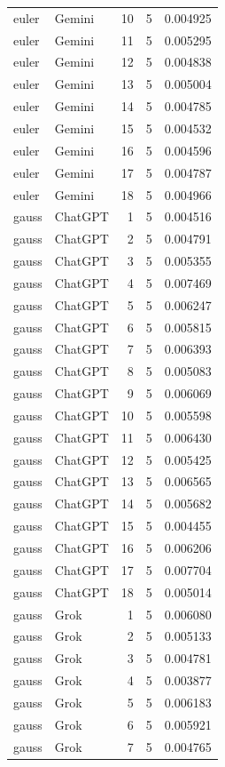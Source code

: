 \begin{longtable}{llrrr}
euler & Gemini & 10 & 5 & 0.004925\\
euler & Gemini & 11 & 5 & 0.005295\\
euler & Gemini & 12 & 5 & 0.004838\\
euler & Gemini & 13 & 5 & 0.005004\\
euler & Gemini & 14 & 5 & 0.004785\\
euler & Gemini & 15 & 5 & 0.004532\\
euler & Gemini & 16 & 5 & 0.004596\\
euler & Gemini & 17 & 5 & 0.004787\\
euler & Gemini & 18 & 5 & 0.004966\\
gauss & ChatGPT & 1 & 5 & 0.004516\\
gauss & ChatGPT & 2 & 5 & 0.004791\\
gauss & ChatGPT & 3 & 5 & 0.005355\\
gauss & ChatGPT & 4 & 5 & 0.007469\\
gauss & ChatGPT & 5 & 5 & 0.006247\\
gauss & ChatGPT & 6 & 5 & 0.005815\\
gauss & ChatGPT & 7 & 5 & 0.006393\\
gauss & ChatGPT & 8 & 5 & 0.005083\\
gauss & ChatGPT & 9 & 5 & 0.006069\\
gauss & ChatGPT & 10 & 5 & 0.005598\\
gauss & ChatGPT & 11 & 5 & 0.006430\\
gauss & ChatGPT & 12 & 5 & 0.005425\\
gauss & ChatGPT & 13 & 5 & 0.006565\\
gauss & ChatGPT & 14 & 5 & 0.005682\\
gauss & ChatGPT & 15 & 5 & 0.004455\\
gauss & ChatGPT & 16 & 5 & 0.006206\\
gauss & ChatGPT & 17 & 5 & 0.007704\\
gauss & ChatGPT & 18 & 5 & 0.005014\\
gauss & Grok & 1 & 5 & 0.006080\\
gauss & Grok & 2 & 5 & 0.005133\\
gauss & Grok & 3 & 5 & 0.004781\\
gauss & Grok & 4 & 5 & 0.003877\\
gauss & Grok & 5 & 5 & 0.006183\\
gauss & Grok & 6 & 5 & 0.005921\\
gauss & Grok & 7 & 5 & 0.004765\\

\end{longtable}
